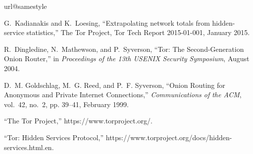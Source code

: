 \documentclass[10pt]{styles/IEEEtran}
\begin{document}
 
\balance

%


\begin{thebibliography}{10}
\providecommand{\url}[1]{#1}
\csname url@samestyle\endcsname
\providecommand{\newblock}{\relax}
\providecommand{\bibinfo}[2]{#2}
\providecommand{\BIBentrySTDinterwordspacing}{\spaceskip=0pt\relax}
\providecommand{\BIBentryALTinterwordstretchfactor}{4}
\providecommand{\BIBentryALTinterwordspacing}{\spaceskip=\fontdimen2\font plus
\BIBentryALTinterwordstretchfactor\fontdimen3\font minus
  \fontdimen4\font\relax}
\providecommand{\BIBforeignlanguage}[2]{{%
\expandafter\ifx\csname l@#1\endcsname\relax
\typeout{** WARNING: IEEEtran.bst: No hyphenation pattern has been}%
\typeout{** loaded for the language `#1'. Using the pattern for}%
\typeout{** the default language instead.}%
\else
\language=\csname l@#1\endcsname
\fi
#2}}
\providecommand{\BIBdecl}{\relax}
\BIBdecl

G.~Kadianakis and K.~Loesing, ``Extrapolating network totals from
  hidden-service statistics,'' The Tor Project, Tor Tech Report 2015-01-001,
  January 2015.

R.~Dingledine, N.~Mathewson, and P.~Syverson, ``{Tor: The Second-Generation
  Onion Router},'' in \emph{Proceedings of the 13th USENIX Security Symposium},
  August 2004.

D.~M. Goldschlag, M.~G. Reed, and P.~F. Syverson, ``{Onion Routing for
  Anonymous and Private Internet Connections},'' \emph{Communications of the
  ACM}, vol.~42, no.~2, pp. 39--41, February 1999.

``{The Tor Project},'' \url{https://www.torproject.org/}.

``{Tor: Hidden Services Protocol},''
  \url{https://www.torproject.org/docs/hidden-services.html.en}.


\end{thebibliography}
\end{document}

